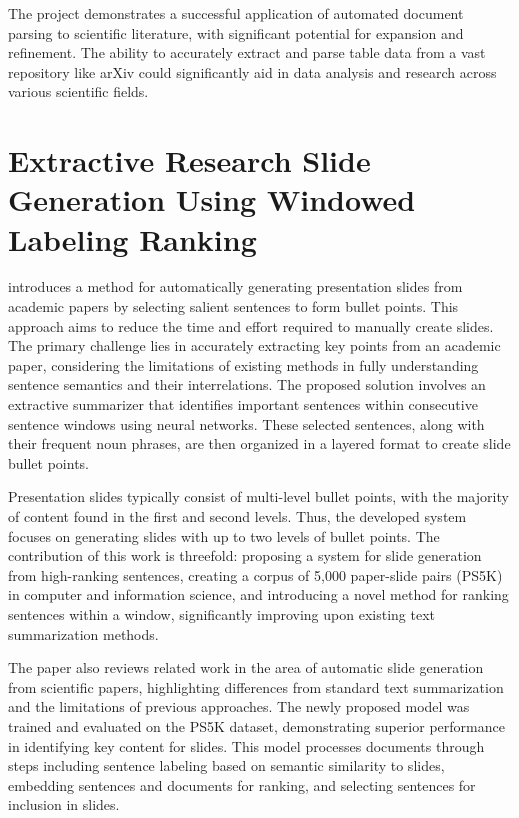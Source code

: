 The project demonstrates a successful application of automated document parsing to scientific literature, with significant potential for expansion and refinement. The ability to accurately extract and parse table data from a vast repository like arXiv could significantly aid in data analysis and research across various scientific fields.


\section{Extractive Research Slide Generation Using Windowed Labeling Ranking}

\citet{Sefid:2021:arXiv} introduces a method for automatically generating presentation slides from academic papers by selecting salient sentences to form bullet points. This approach aims to reduce the time and effort required to manually create slides. The primary challenge lies in accurately extracting key points from an academic paper, considering the limitations of existing methods in fully understanding sentence semantics and their interrelations. The proposed solution involves an extractive summarizer that identifies important sentences within consecutive sentence windows using neural networks. These selected sentences, along with their frequent noun phrases, are then organized in a layered format to create slide bullet points.

Presentation slides typically consist of multi-level bullet points, with the majority of content found in the first and second levels. Thus, the developed system focuses on generating slides with up to two levels of bullet points. The contribution of this work is threefold: proposing a system for slide generation from high-ranking sentences, creating a corpus of 5,000 paper-slide pairs (PS5K) in computer and information science, and introducing a novel method for ranking sentences within a window, significantly improving upon existing text summarization methods.

The paper also reviews related work in the area of automatic slide generation from scientific papers, highlighting differences from standard text summarization and the limitations of previous approaches. The newly proposed model was trained and evaluated on the PS5K dataset, demonstrating superior performance in identifying key content for slides. This model processes documents through steps including sentence labeling based on semantic similarity to slides, embedding sentences and documents for ranking, and selecting sentences for inclusion in slides.

